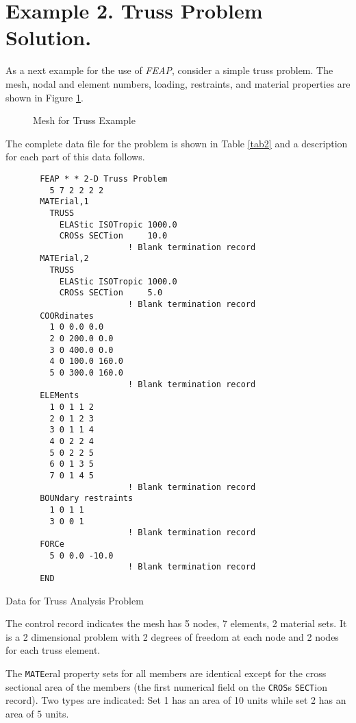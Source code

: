 \section{Example 2.  Truss Problem Solution.}
\label{ex2}

As a next example for the use of {\sl FEAP}, consider a simple truss problem.
The mesh, nodal and element numbers, loading, restraints, and material
properties are shown in Figure \ref{fig2}.

\begin{figure}[ht!]
\epsfysize=2.3in
\centerline {\hfil {} \hfil}
\caption{Mesh for Truss Example}
\label{fig2}
\end{figure}
The complete data file for the problem is shown in Table \ref{tab2} and a 
description for each part of this data follows.

\begin{table}
\begin{verbatim}
       FEAP * * 2-D Truss Problem
         5 7 2 2 2 2
       MATErial,1
         TRUSS
           ELAStic ISOTropic 1000.0
           CROSs SECTion     10.0
                         ! Blank termination record
       MATErial,2
         TRUSS
           ELAStic ISOTropic 1000.0
           CROSs SECTion     5.0
                         ! Blank termination record
       COORdinates
         1 0 0.0 0.0
         2 0 200.0 0.0
         3 0 400.0 0.0
         4 0 100.0 160.0
         5 0 300.0 160.0
                         ! Blank termination record
       ELEMents
         1 0 1 1 2
         2 0 1 2 3
         3 0 1 1 4
         4 0 2 2 4
         5 0 2 2 5
         6 0 1 3 5
         7 0 1 4 5
                         ! Blank termination record
       BOUNdary restraints
         1 0 1 1
         3 0 0 1
                         ! Blank termination record
       FORCe
         5 0 0.0 -10.0
                         ! Blank termination record
       END
\end{verbatim}
\caption{Data for Truss Analysis Problem}
\label{tab2}
\end{table}

The control record indicates the mesh has 5 nodes, 7 elements, 2 
material sets. It is a 2 dimensional problem with 2 degrees of freedom at each
node and 2 nodes for each truss element.

The {\tt MATE}eral property sets for all members
are identical except for the cross sectional
area of the members (the first numerical field on the {\tt CROS}s
{\tt SECT}ion record). Two types are indicated: Set 1 has an area of 10 units
while set 2 has an area of 5 units.

